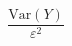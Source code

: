 \documentclass[preview]{standalone}
\begin{document}
\begin{align*}
\dfrac{\mathrm{Var}(Y)}{\varepsilon^2}
\end{align*}
\end{document}
